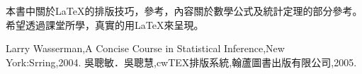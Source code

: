 




%
%
%
%

%
%
%   
\chapter*{} %

本書中關於\LaTeX 的排版技巧，參考\cite{CW}，內容關於數學公式及統計定理的部分參考\cite{LW}。希望透過課堂所學，真實的用\LaTeX 來呈現。
\begin{thebibliography}{99} %
Larry Wasserman,A Concise Course in Statistical Inference,New York:Srring,2004.
吳聰敏．吳聰慧,cwTEX排版系統,翰蘆圖書出版有限公司,2005.
\end{thebibliography}

